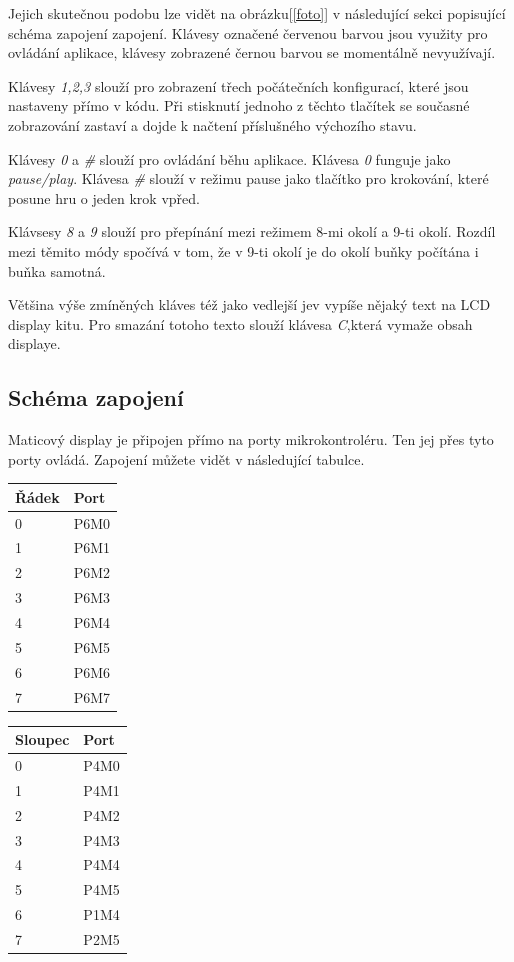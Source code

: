 \documentclass[12pt,a4paper,titlepage]{article}
\begin{document}
Jejich skutečnou podobu lze vidět na obrázku[\ref{foto}] v následující sekci popisující schéma zapojení zapojení. Klávesy označené červenou barvou jsou využity pro ovládání aplikace, klávesy zobrazené černou barvou se momentálně nevyužívají.

Klávesy \textit{1,2,3} slouží pro zobrazení třech počátečních konfigurací, které jsou nastaveny přímo v kódu. Při stisknutí jednoho z těchto tlačítek se současné zobrazování zastaví a dojde k načtení příslušného výchozího stavu.

Klávesy \textit{0} a \textit{\#} slouží pro ovládání běhu aplikace. Klávesa \textit{0} funguje jako \textit{pause/play}. Klávesa \textit{\#} slouží v režimu pause jako tlačítko pro krokování, které posune hru o jeden krok vpřed.

Klávsesy \textit{8} a \textit{9} slouží pro přepínání mezi režimem 8-mi okolí a 9-ti okolí. Rozdíl mezi těmito módy spočívá v tom, že v 9-ti okolí je do okolí buňky počítána i buňka samotná.

Většina výše zmíněných kláves též jako vedlejší jev vypíše nějaký text na LCD display kitu. Pro smazání totoho texto slouží klávesa \textit{C},která vymaže obsah displaye.

\subsection{Schéma zapojení}
Maticový display je připojen přímo na porty mikrokontroléru. Ten jej přes tyto porty ovládá. Zapojení můžete vidět v následující tabulce. 

\begin{minipage}{\linewidth}
\bigskip
\centering
  \begin{tabular}{ | l | l|}
    \hline
    Řádek & Port \\ \hline
    0 & P6M0 \\ \hline
    1 & P6M1  \\ \hline
    2 & P6M2 \\ \hline
	3 & P6M3 \\ \hline
	4 & P6M4 \\ \hline
	5 & P6M5 \\ \hline
	6 & P6M6 \\ \hline
    7 & P6M7  \\
    \hline
  \end{tabular}
  \begin{tabular}{ | l | l|}
    \hline
    Sloupec & Port \\ \hline
    0 & P4M0 \\ \hline
    1 & P4M1  \\ \hline
    2 & P4M2 \\ \hline
	3 & P4M3 \\ \hline
	4 & P4M4 \\ \hline
	5 & P4M5 \\ \hline
	6 & P1M4 \\ \hline
    7 & P2M5  \\
    \hline
  \end{tabular}
   \label{fitkit:display}

\bigskip
\end{minipage}
\end{document}
